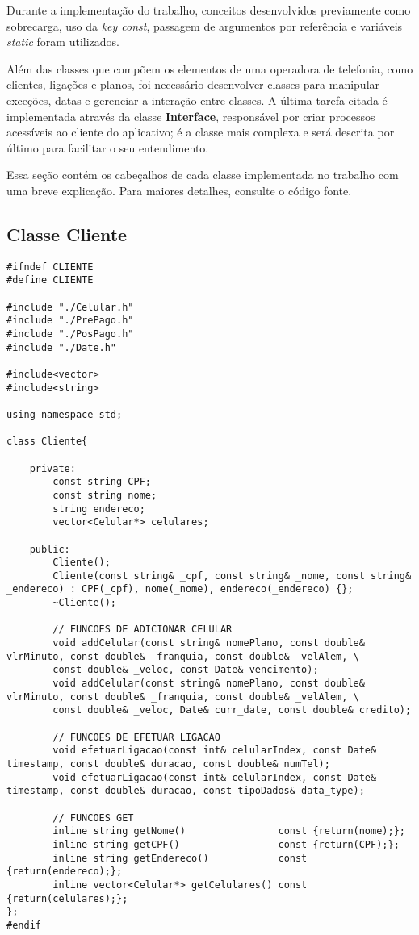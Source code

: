 Durante a implementação do trabalho, conceitos desenvolvidos previamente como sobrecarga, uso da \textit{key const}, passagem de argumentos por referência e variáveis \textit{static} foram utilizados.

Além das classes que compõem os elementos de uma operadora de telefonia, como clientes, ligações e planos, foi necessário desenvolver classes para manipular exceções, datas e gerenciar a interação entre classes. A última tarefa citada é implementada através da classe \textbf{Interface}, responsável por criar processos acessíveis ao cliente do aplicativo; é a classe mais complexa e será descrita por último para facilitar o seu entendimento.

Essa seção contém os cabeçalhos de cada classe implementada no trabalho com uma breve explicação. Para maiores detalhes, consulte o código fonte.

\subsection{Classe Cliente} \label{sec:cliente}

\begin{lstlisting}[basicstyle=\tiny]
#ifndef CLIENTE
#define CLIENTE

#include "./Celular.h"
#include "./PrePago.h"
#include "./PosPago.h"
#include "./Date.h"

#include<vector>
#include<string>

using namespace std;

class Cliente{

	private:
		const string CPF;
		const string nome;
		string endereco;
		vector<Celular*> celulares;
	
	public:
		Cliente();
		Cliente(const string& _cpf, const string& _nome, const string& _endereco) : CPF(_cpf), nome(_nome), endereco(_endereco) {};
		~Cliente();
		
		// FUNCOES DE ADICIONAR CELULAR
		void addCelular(const string& nomePlano, const double& vlrMinuto, const double& _franquia, const double& _velAlem, \
		const double& _veloc, const Date& vencimento);
		void addCelular(const string& nomePlano, const double& vlrMinuto, const double& _franquia, const double& _velAlem, \
		const double& _veloc, Date& curr_date, const double& credito);
		
		// FUNCOES DE EFETUAR LIGACAO
		void efetuarLigacao(const int& celularIndex, const Date& timestamp, const double& duracao, const double& numTel);
		void efetuarLigacao(const int& celularIndex, const Date& timestamp, const double& duracao, const tipoDados& data_type);
		
		// FUNCOES GET
		inline string getNome()                const {return(nome);};
		inline string getCPF()                 const {return(CPF);};
		inline string getEndereco()            const {return(endereco);};
		inline vector<Celular*> getCelulares() const {return(celulares);};
};
#endif
\end{lstlisting}

